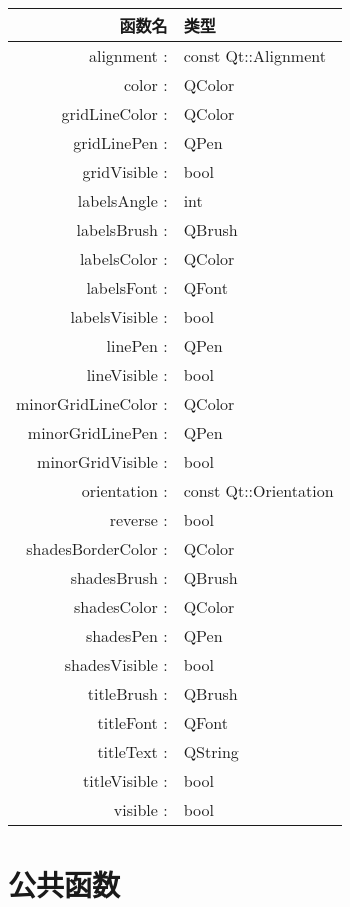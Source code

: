 \begin{longtable}{|r|l|}
\hline
函数名 & 类型 \\
\hline
alignment :&	const Qt::Alignment\\
\hline
color :&	QColor\\
\hline
gridLineColor :&	QColor\\
\hline
gridLinePen :&	QPen\\
\hline
gridVisible :&	bool\\
\hline
labelsAngle :&	int\\
\hline
labelsBrush :&	QBrush\\
\hline
labelsColor :&	QColor\\
\hline
labelsFont :&	QFont\\
\hline
labelsVisible :&	bool\\
\hline
linePen :&	QPen\\
\hline
lineVisible :&	bool\\
\hline
minorGridLineColor :&	QColor\\
\hline
minorGridLinePen :&	QPen\\
\hline
minorGridVisible :&	bool\\
\hline
orientation :&	const Qt::Orientation\\
\hline
reverse :&	bool\\
\hline
shadesBorderColor :&	QColor\\
\hline
shadesBrush :&	QBrush\\
\hline
shadesColor :&	QColor\\
\hline
shadesPen :&	QPen\\
\hline
shadesVisible :&	bool\\
\hline
titleBrush :&	QBrush\\
\hline
titleFont :&	QFont\\
\hline
titleText :&	QString\\
\hline
titleVisible :&	bool\\
\hline
visible :&	bool\\
\hline
\end{longtable}

\section{公共函数}

